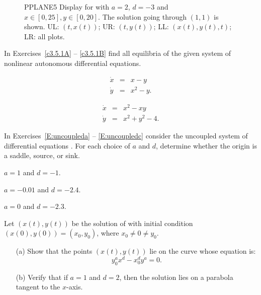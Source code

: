\documentclass{ximera}
\begin{document}
\begin{figure}[htb]
     \centerline{%
     }
     \centerline{%
     }
     \caption{{\sf PPLANE5 Display} for \protect{} with
             $a=2$, $d=-3$ and $x\in [0,25], y\in [0,20]$. The solution
             going through $(1,1)$ is shown. UL: $(t,x(t))$;
	UR: $(t,y(t))$; LL: $(x(t),y(t),t)$; LR: all plots.}
     \label{plotall}
\end{figure}


\EXER

\TEXER

\noindent In Exercises~\ref{c3.5.1A} -- \ref{c3.5.1B} find all equilibria of
the given system of nonlinear autonomous differential equations.
\begin{exercise}  \label{c3.5.1A}
\begin{eqnarray*}
\dot{x} & = & x - y\\
\dot{y} & = & x^2 - y.
\end{eqnarray*}
\end{exercise}
\begin{exercise}  \label{c3.5.1B}
\begin{eqnarray*}
\dot{x} & = & x^2 - xy\\
\dot{y} & = & x^2 + y^2 - 4.
\end{eqnarray*}
\end{exercise}


\noindent In Exercises~\ref{E:uncoupleda} -- \ref{E:uncoupledc}
consider the uncoupled system of differential equations .
For each choice of $a$ and $d$, determine whether the origin is a
saddle, source, or sink.
\begin{exercise} \label{E:uncoupleda}
$a=1$ and $d=-1$.
\end{exercise}
\begin{exercise} \label{E:uncoupledb}
$a=-0.01$ and $d=-2.4$.
\end{exercise}
\begin{exercise} \label{E:uncoupledc}
$a=0$ and $d=-2.3$.
\end{exercise}

\begin{exercise} \label{c3.4.2}
Let $(x(t),y(t))$ be the solution  of 
with initial condition $(x(0),y(0))=(x_0,y_0)$, where $x_0\neq 0 \neq y_0$.
\begin{itemize}
\item[(a)] Show that the points $(x(t),y(t))$ lie on the curve whose 
equation is:
\[
y_0^ax^d - x_0^dy^a = 0.
\]
\item[(b)] Verify that if $a=1$ and $d=2$, then the solution lies
on a parabola tangent to the $x$-axis.
\end{itemize}
\end{exercise}
\end{document}
